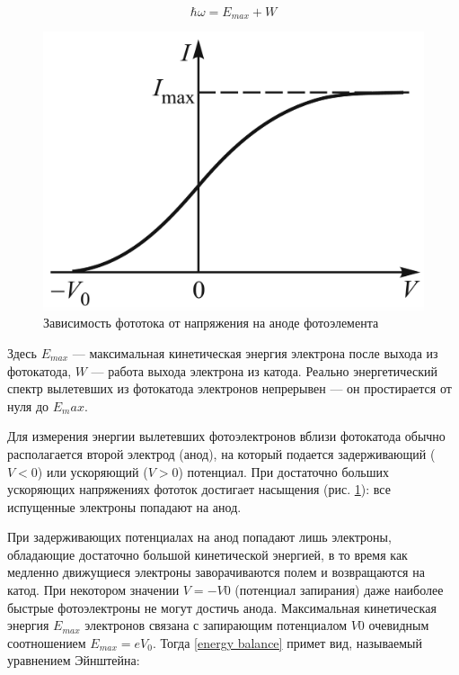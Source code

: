 \documentclass[12pt]{kiarticle}
\begin{document}
	\begin{equation}\label{energy balance}
	\hbar \omega = E_{max} + W
	\end{equation}
	
	\begin{figure}
		\includegraphics[width=\linewidth]{I(V)}
		\caption{Зависимость фототока от напряжения на аноде фотоэлемента}
		\label{ris I(V)}
	\end{figure}
	
	Здесь $ E_{max} $ ---  максимальная кинетическая энергия электрона после выхода из фотокатода, $ W $ --- работа выхода электрона из катода. Реально энергетический спектр вылетевших из фотокатода электронов непрерывен --- он простирается от нуля до $ E_max $. 
	
	Для измерения энергии вылетевших фотоэлектронов вблизи фотокатода
	обычно располагается второй электрод
	(анод), на который подается задерживающий ($ V < 0 $) или ускоряющий ($ V >
	0 $) потенциал. При достаточно больших
	ускоряющих напряжениях фототок достигает насыщения (рис. \ref{ris I(V)}): все испущенные электроны попадают на анод.
	
	При задерживающих потенциалах на анод попадают лишь электроны,
	обладающие достаточно большой кинетической энергией, в то время
	как медленно движущиеся электроны заворачиваются полем и возвращаются на катод. При некотором значении $ V = -V0 $ (потенциал запирания) даже наиболее быстрые фотоэлектроны не могут достичь
	анода.
	Максимальная кинетическая энергия $ E_{max} $ электронов связана с
	запирающим потенциалом $ V0 $ очевидным соотношением $ E_{max} = eV_0 $. Тогда \eqref{energy balance} примет вид, называемый уравнением Эйнштейна:
	
\end{document}
